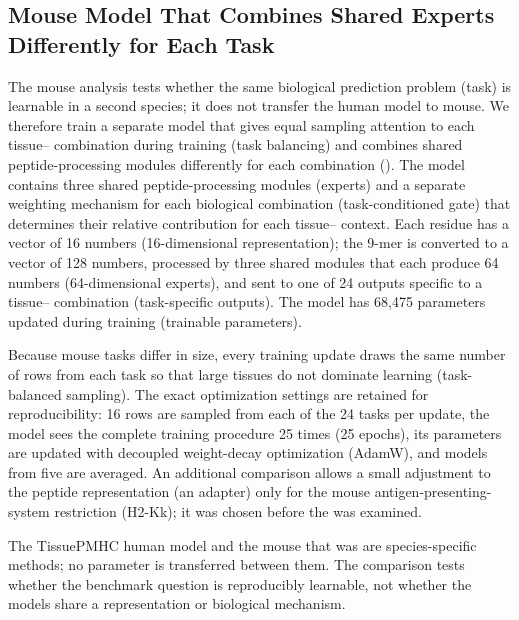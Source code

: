 \subsection{Mouse Model That Combines Shared Experts Differently for Each Task}

The mouse analysis tests whether the same biological prediction problem (task) is learnable in a second species; it does not transfer the human model to mouse. We therefore train a separate model that gives equal sampling attention to each tissue--\plainHtwo{} combination during training (task balancing) and combines shared peptide-processing modules differently for each combination (\plainMMoE{}). The model contains three shared peptide-processing modules (experts) and a separate weighting mechanism for each biological combination (task-conditioned gate) that determines their relative contribution for each tissue--\plainHtwo{} context. Each residue has a vector of 16 numbers (16-dimensional representation); the 9-mer is converted to a vector of 128 numbers, processed by three shared modules that each produce 64 numbers (64-dimensional experts), and sent to one of 24 outputs specific to a tissue--\plainHtwo{} combination (task-specific outputs). The model has 68,475 parameters updated during training (trainable parameters).

Because mouse tasks differ in size, every training update draws the same number of rows from each task so that large tissues do not dominate learning (task-balanced sampling). The exact optimization settings are retained for reproducibility: 16 rows are sampled from each of the 24 tasks per update, the model sees the complete training procedure 25 times (25 epochs), its parameters are updated with decoupled weight-decay optimization (AdamW), and models from five \plainSeeds{} are averaged. An additional comparison allows a small adjustment to the peptide representation (an adapter) only for the mouse antigen-presenting-system restriction (H2-Kk); it was chosen before the \plainFixedTest{} was examined.

The TissuePMHC human model and the mouse \plainMMoE{} that was \plainFrozen{} are species-specific methods; no parameter is transferred between them. The comparison tests whether the benchmark question is reproducibly learnable, not whether the models share a representation or biological mechanism.
